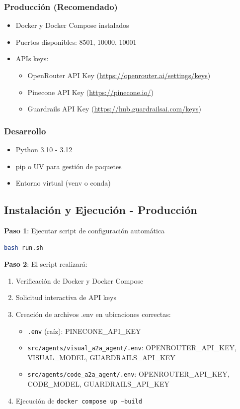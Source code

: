\documentclass[12pt,a4paper]{article}
\begin{document}
\subsubsection{Producción (Recomendado)}
\begin{itemize}
    \item Docker y Docker Compose instalados
    \item Puertos disponibles: 8501, 10000, 10001
    \item APIs keys:
    \begin{itemize}
        \item OpenRouter API Key (\url{https://openrouter.ai/settings/keys})
        \item Pinecone API Key (\url{https://pinecone.io/})
        \item Guardrails API Key (\url{https://hub.guardrailsai.com/keys})
    \end{itemize}
\end{itemize}

\subsubsection{Desarrollo}
\begin{itemize}
    \item Python 3.10 - 3.12
    \item pip o UV para gestión de paquetes
    \item Entorno virtual (venv o conda)
\end{itemize}

\subsection{Instalación y Ejecución - Producción}

\textbf{Paso 1}: Ejecutar script de configuración automática

\begin{lstlisting}[language=bash]
bash run.sh
\end{lstlisting}

\textbf{Paso 2}: El script realizará:
\begin{enumerate}
    \item Verificación de Docker y Docker Compose
    \item Solicitud interactiva de API keys
    \item Creación de archivos .env en ubicaciones correctas:
    \begin{itemize}
        \item \texttt{.env} (raíz): PINECONE\_API\_KEY
        \item \texttt{src/agents/visual\_a2a\_agent/.env}: OPENROUTER\_API\_KEY, VISUAL\_MODEL, GUARDRAILS\_API\_KEY
        \item \texttt{src/agents/code\_a2a\_agent/.env}: OPENROUTER\_API\_KEY, CODE\_MODEL, GUARDRAILS\_API\_KEY
    \end{itemize}
    \item Ejecución de \texttt{docker compose up --build}
\end{enumerate}
\end{document}
